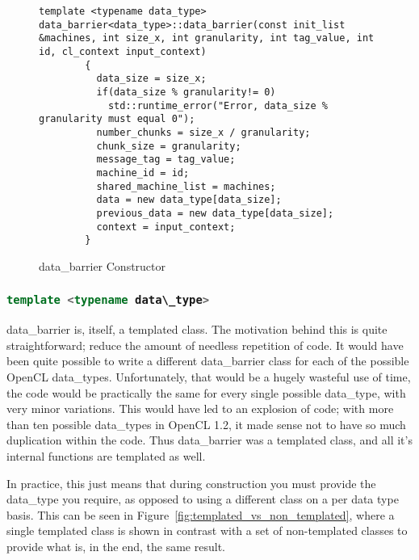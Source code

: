 \documentclass[thesis.tex]{subfiles}
\begin{document}
  \begin{figure}[htbp]
    \centering

    \lstset{language=cpp}  
    \begin{lstlisting}[tabsize=2]
        template <typename data_type> data_barrier<data_type>::data_barrier(const init_list &machines, int size_x, int granularity, int tag_value, int id, cl_context input_context)
        {
          data_size = size_x;
          if(data_size % granularity!= 0)
            std::runtime_error("Error, data_size % granularity must equal 0");
          number_chunks = size_x / granularity;
          chunk_size = granularity;
          message_tag = tag_value;
          machine_id = id;
          shared_machine_list = machines;
          data = new data_type[data_size];
          previous_data = new data_type[data_size];
          context = input_context;
        }

      \end{lstlisting}

    \caption{data\_barrier Constructor}
    \label{fig:data_barrier_constructor}
  \end{figure}
   

  \subsubsection{\lstinline[language=cpp]{template <typename data\_type>}} %
  \label{ssub:template_typename_data_type}
    data\_barrier is, itself, a templated class. The motivation behind this is quite straightforward; reduce the amount of needless repetition of code. It would have been quite possible to write a different data\_barrier class for each of the possible OpenCL data\_types. Unfortunately, that would be a hugely wasteful use of time, the code would be practically the same for every single possible data\_type, with very minor variations. This would have led to an explosion of code; with more than ten possible data\_types \cite{opencldatatypes} in OpenCL 1.2, it made sense not to have so much duplication within the code. Thus data\_barrier was a templated class, and all it's internal functions are templated as well.

    In practice, this just means that during construction you must provide the data\_type you require, as opposed to using a different class on a per data type basis. This can be seen in Figure~\ref{fig:templated_vs_non_templated}, where a single templated class is shown in contrast with a set of non-templated classes to provide what is, in the end, the same result.
\end{document}
